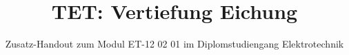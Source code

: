 

\title[Vertiefung Eichung]{TET: Vertiefung Eichung}

\subtitle{Zusatz-Handout zum Modul ET-12 02 01 im Diplomstudiengang Elektrotechnik}

% 
% 

\maketitle

% 
% 


